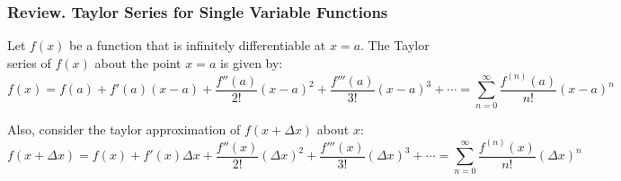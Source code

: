 \documentclass[11pt]{report}
\begin{document}
\begin{shaded}
    \subsubsection{Review. Taylor Series for Single Variable Functions}
    Let $f(x)$ be a function that is infinitely differentiable at $x = a$. The Taylor series of $f(x)$ about the point $x = a$ is given by:
    \begin{equation}
        f(x) = f(a) + f'(a)(x-a) + \frac{f''(a)}{2!}(x-a)^2 + \frac{f'''(a)}{3!}(x-a)^3 + \cdots = \sum_{n=0}^{\infty} \frac{f^{(n)}(a)}{n!} (x-a)^n
    \end{equation}

    Also, consider the taylor approximation of $f(x + \Delta x)$ about $x$: 
    \begin{equation}
        f(x + \Delta x) = f(x) + f'(x)\Delta x + \frac{f''(x)}{2!}(\Delta x)^2 + \frac{f'''(x)}{3!}(\Delta x)^3 + \cdots = \sum_{n=0}^{\infty} \frac{f^{(n)}(x)}{n!} (\Delta x)^n
    \end{equation}
\end{shaded}
\end{document}
